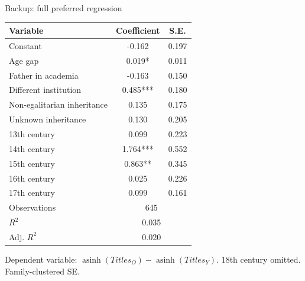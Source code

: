 \documentclass[aspectratio=169,10pt]{beamer}
\begin{document}
\begin{frame}{Backup: full preferred regression}
\centering
\scriptsize
\begin{tabular}{lcc}
\toprule
Variable & Coefficient & S.E.\\
\midrule
Constant & -0.162 & 0.197\\
Age gap & 0.019* & 0.011\\
Father in academia & -0.163 & 0.150\\
Different institution & 0.485*** & 0.180\\
Non-egalitarian inheritance & 0.135 & 0.175\\
Unknown inheritance & 0.130 & 0.205\\
13th century & 0.099 & 0.223\\
14th century & 1.764*** & 0.552\\
15th century & 0.863** & 0.345\\
16th century & 0.025 & 0.226\\
17th century & 0.099 & 0.161\\
\midrule
Observations & \multicolumn{2}{c}{645}\\
\(R^2\) & \multicolumn{2}{c}{0.035}\\
Adj. \(R^2\) & \multicolumn{2}{c}{0.020}\\
\bottomrule
\end{tabular}

\vspace{0.4em}
{\scriptsize Dependent variable: \(\operatorname{asinh}(Titles_O)-\operatorname{asinh}(Titles_Y)\). 18th century omitted. Family-clustered SE.}
\end{frame}
\end{document}
